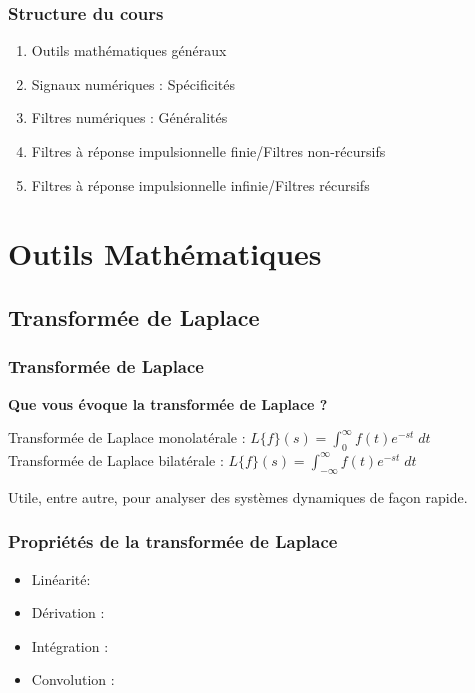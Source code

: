 \documentclass{beamer}
\begin{document}
\begin{frame} 
\frametitle{Structure du cours}
\begin{enumerate}
\item Outils mathématiques généraux  
\item Signaux numériques : Spécificités 
\item Filtres numériques : Généralités 
\item Filtres à réponse impulsionnelle finie/Filtres non-récursifs 
\item Filtres à réponse impulsionnelle infinie/Filtres récursifs 
\end{enumerate}
\end{frame} 

\section{Outils Mathématiques}
\subsection{Transformée de Laplace}

\begin{frame}
\frametitle{Transformée de Laplace}
\textbf{Que vous évoque la transformée de Laplace ?}\\

\vspace{1cm}

{
	Transformée de Laplace monolatérale : $L\{f\}(s) = \displaystyle \int^{\infty}_{0} f(t) e^{-st} \; dt$\\ 
	\vspace{0.3cm}
	Transformée de Laplace bilatérale : $L\{f\}(s) = \displaystyle \int^{\infty}_{-\infty} f(t) e^{-st} \; dt$
}

{
\begin{block}{}
Utile, entre autre, pour analyser des systèmes dynamiques de façon rapide.
\end{block}
}

\end{frame}

\begin{frame}
\frametitle{Propriétés de la transformée de Laplace}
\begin{itemize}
\item<2-> Linéarité: 
\item<4-> Dérivation : 
\item<5-> Intégration : 
\item<7-> Convolution : 
\end{itemize}

\end{frame}
\end{document}
